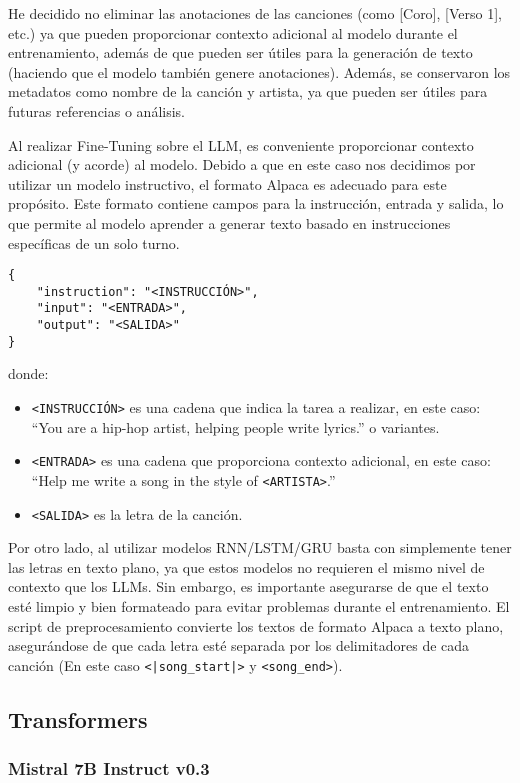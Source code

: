 \documentclass[paper=letter, fontsize=11pt, draft=false]{scrartcl}
\numberwithin{equation}{section} %
\numberwithin{figure}{section} %
\numberwithin{table}{section} %
\numberwithin{subsection}{section}
\begin{document}
He decidido no eliminar las anotaciones de las canciones (como [Coro], [Verso 1], etc.) ya que pueden proporcionar contexto adicional al modelo durante el entrenamiento, además de que pueden ser útiles para la generación de texto (haciendo que el modelo también genere anotaciones). Además, se conservaron los metadatos como nombre de la canción y artista, ya que pueden ser útiles para futuras referencias o análisis.

Al realizar Fine-Tuning sobre el LLM, es conveniente proporcionar contexto adicional (y acorde) al modelo. Debido a que en este caso nos decidimos por utilizar un modelo instructivo, el formato Alpaca es adecuado para este propósito. Este formato contiene campos para la instrucción, entrada y salida, lo que permite al modelo aprender a generar texto basado en instrucciones específicas de un solo turno.
\begin{verbatim}
{
    "instruction": "<INSTRUCCIÓN>",
    "input": "<ENTRADA>",
    "output": "<SALIDA>"
}
\end{verbatim}

donde:
\begin{itemize} 
    \item \texttt{<INSTRUCCIÓN>} es una cadena que indica la tarea a realizar, en este caso: ``You are a hip-hop artist, helping people write lyrics.'' o variantes.
    \item \texttt{<ENTRADA>} es una cadena que proporciona contexto adicional, en este caso: ``Help me write a song in the style of \texttt{<ARTISTA>}.''
    \item \texttt{<SALIDA>} es la letra de la canción.
\end{itemize}

Por otro lado, al utilizar modelos RNN/LSTM/GRU basta con simplemente tener las letras en texto plano, ya que estos modelos no requieren el mismo nivel de contexto que los LLMs. Sin embargo, es importante asegurarse de que el texto esté limpio y bien formateado para evitar problemas durante el entrenamiento. El script de preprocesamiento convierte los textos de formato Alpaca a texto plano, asegurándose de que cada letra esté separada por los delimitadores de cada canción (En este caso \texttt{<|song\_start|>} y \texttt{<song\_end>}).


\subsection{Transformers}

\subsubsection{Mistral 7B Instruct v0.3}
\end{document}
